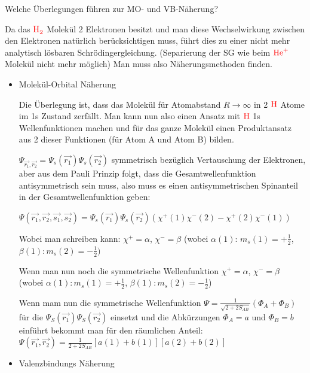\documentclass[a5paper,12pt,ngerman,grid=front %
,print
]{kartei}
\let\oldce\ce
\renewcommand*{\ce}[1]{\begingroup\color{red}\oldce{#1}\endgroup}
\begin{document}
	\begin{karte}{
		Welche Überlegungen führen zur MO- und VB-Näherung?
		}
			
		Da das $\ce{H2}$ Molekül 2 Elektronen besitzt und man diese Wechselwirkung zwischen 
		den Elektronen natürlich berücksichtigen muss, führt dies zu einer nicht mehr 
		analytisch lösbaren Schrödingergleichung. 
		(Separierung der SG wie beim $\ce{He^+}$ Molekül nicht mehr möglich)
		Man muss also Näherungsmethoden finden.
		
		\begin{itemize}
			\item Molekül-Orbital Näherung 
			
			Die Überlegung ist, dass das Molekül für Atomabstand $R \rightarrow \infty$ 
			in 2 $\ce{H}$ Atome im 1s Zustand zerfällt. 
			Man kann nun also einen Ansatz mit $\ce{H}$ 1s Wellenfunktionen machen und für 
			das ganze Molekül einen Produktansatz aus 2 dieser Funktionen 
			(für Atom A und Atom B) bilden.
			
			$\Psi_{\vec{r_1},\vec{r_2}} = \Psi_s(\vec{r_1})\Psi_s(\vec{r_2})$ symmetrisch bezüglich
			Vertauschung der Elektronen, aber aus dem Pauli Prinzip
			folgt, dass die Gesamtwellenfunktion antisymmetrisch sein muss, also muss es 
			einen antisymmetrischen Spinanteil in der Gesamtwellenfunktion geben:
			
			$\Psi(\vec{r_1},\vec{r_2},\vec{s_1},\vec{s_2})=
			\Psi_s(\vec{r_1})\Psi_s(\vec{r_2})(\chi^+(1)\chi^-(2) - \chi^+(2)\chi^-(1))$
			
			Wobei man schreiben kann: 
			$\chi^+ = \alpha$, $\chi^- = \beta$ 
			(wobei $\alpha(1)$: $m_s(1) = +\frac{1}{2}$, $\beta(1): m_s(2) = -\frac{1}{2})$
			
			Wenn man nun noch die symmetrische Wellenfunktion 
			$\chi^+ = \alpha$, $\chi^- = \beta$ 
			(wobei 
			$\alpha(1): m_s(1)= +\frac{1}{2}$, 
			$\beta(1):  m_s(2)= -\frac{1}{2}$)
			
			Wenn mam nun die symmetrische Wellenfunktion 
			$\Psi= \frac{1}{\sqrt{2+2S_{AB}}}(\Phi_A+\Phi_B)$
			für die $\Psi_S(\vec{r_1} ) \Psi_S(\vec{r_2} )$ einsetzt und die Abkürzungen $\Phi_A=a$ und 
			$\Phi_B=b$ einführt bekommt man für den räumlichen Anteil:
			$  \Psi( \vec{r_1}, \vec{r_2} ) = \frac{1}{2+2S_{AB}} \left[ a(1)+b(1) \right]\left[ a(2)+b(2) \right]   $
			
		\item Valenzbindungs Näherung 
		

\end{itemize}
\end{karte}
\end{document}
